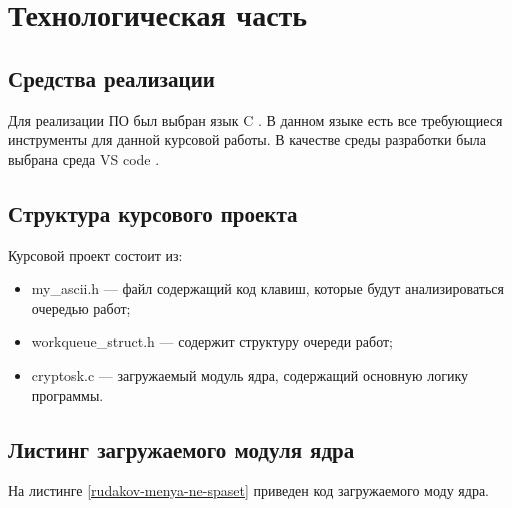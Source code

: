\section{\large Технологическая часть}

\subsection{Средства реализации}

Для реализации ПО был выбран язык C \cite{C}.
В данном языке есть все требующиеся инструменты для данной курсовой работы.
В качестве среды разработки была выбрана среда VS code \cite{vscode}.

\subsection{Структура курсового проекта}

Курсовой проект состоит из:

\begin{itemize}
    \item my\_ascii.h --- файл содержащий код клавиш, которые будут анализироваться очередью работ;
    \item workqueue\_struct.h --- содержит структуру очереди работ;
    \item cryptosk.c --- загружаемый модуль ядра, содержащий основную логику программы.
\end{itemize}

\subsection{Листинг загружаемого модуля ядра}

На листинге \ref{rudakov-menya-ne-spaset} приведен код загружаемого моду ядра. 

